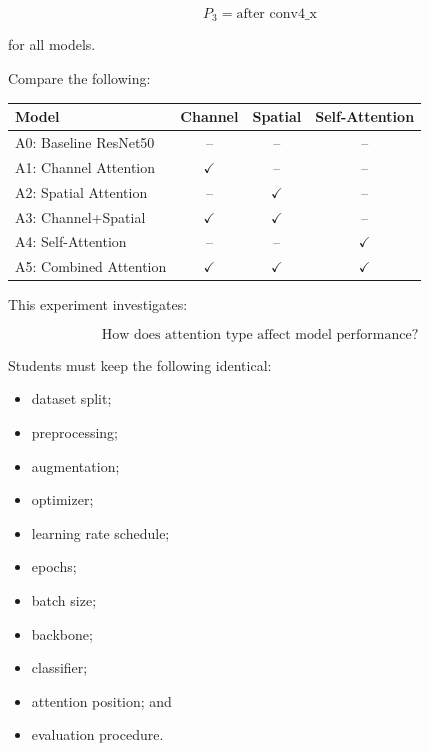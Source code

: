 \documentclass[10pt]{article}
\begin{document}
\[
\boxed{
P_3=\text{after conv4\_x}
}
\]

for all models.

Compare the following:

\begin{center}

\begin{tabular}{|l|c|c|c|}
\hline

\textbf{Model}
&
\textbf{Channel}
&
\textbf{Spatial}
&
\textbf{Self-Attention}
\\
\hline

A0: Baseline ResNet50
&
--
&
--
&
--
\\
\hline

A1: Channel Attention
&
$\checkmark$
&
--
&
--
\\
\hline

A2: Spatial Attention
&
--
&
$\checkmark$
&
--
\\
\hline

A3: Channel+Spatial
&
$\checkmark$
&
$\checkmark$
&
--
\\
\hline

A4: Self-Attention
&
--
&
--
&
$\checkmark$
\\
\hline

A5: Combined Attention
&
$\checkmark$
&
$\checkmark$
&
$\checkmark$
\\
\hline

\end{tabular}

\end{center}

This experiment investigates:

\[
\boxed{
\text{How does attention type affect model performance?}
}
\]

Students must keep the following identical:

\begin{itemize}

\item dataset split;

\item preprocessing;

\item augmentation;

\item optimizer;

\item learning rate schedule;

\item epochs;

\item batch size;

\item backbone;

\item classifier;

\item attention position; and

\item evaluation procedure.

\end{itemize}
\end{document}

